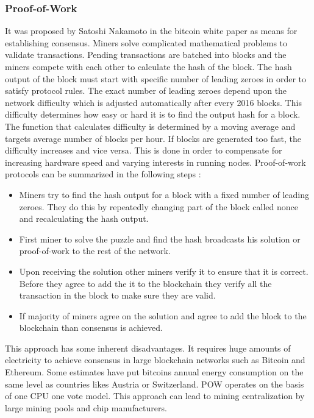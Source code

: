 \subsubsection{Proof-of-Work} \label{PW}
It was proposed by Satoshi Nakamoto in the bitcoin white paper \cite{paper:001} as means for establishing consensus. Miners solve complicated mathematical problems to validate transactions. Pending transactions are batched into blocks and the miners compete with each other to calculate the hash of the block. The hash output of the block must start with specific number of leading zeroes in order to satisfy protocol rules. The exact number of leading zeroes depend upon the network difficulty which is adjusted automatically after every 2016 blocks. This difficulty determines how easy or hard it is to find the output hash for a block. The function that calculates difficulty is determined by a moving average and targets average number of blocks per hour. If blocks are generated too fast, the difficulty increases and vice versa. This is done in order to compensate for increasing hardware speed and varying interests in running nodes. Proof-of-work protocols can be summarized in the following steps \cite{medium:001}:

\begin{itemize}
  \item Miners try to find the hash output for a block with a fixed number of leading zeroes. They do this by repeatedly changing part of the block called nonce and recalculating the hash output.
  \item First miner to solve the puzzle and find the hash broadcasts his solution or proof-of-work to the rest of the network.
  \item Upon receiving the solution other miners verify it to ensure that it is correct. Before they agree to add the it to the blockchain they verify all the transaction in the block to make sure they are valid.
  \item If majority of miners agree on the solution and agree to add the block to the blockchain than consensus is achieved.
\end{itemize}
This approach has some inherent disadvantages. It requires huge amounts of electricity to achieve consensus in large blockchain networks such as Bitcoin and Ethereum. Some estimates have put bitcoins annual energy consumption on the same level as countries likes Austria or Switzerland. POW operates on the basis of one CPU one vote model. This approach can lead to mining centralization by large mining pools and chip manufacturers.

